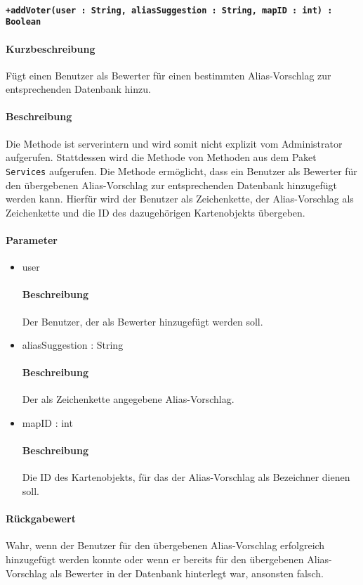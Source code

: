 \paragraph*{\texttt{+addVoter(user : String, aliasSuggestion : String, mapID : int) : Boolean}}%
\paragraph*{Kurzbeschreibung}
Fügt einen Benutzer als Bewerter für einen bestimmten Alias-Vorschlag zur entsprechenden Datenbank hinzu.
\paragraph*{Beschreibung}
Die Methode ist serverintern und wird somit nicht explizit vom Administrator aufgerufen.
Stattdessen wird die Methode von Methoden aus dem Paket \texttt{Services} aufgerufen.
Die Methode ermöglicht, dass ein Benutzer als Bewerter für den übergebenen Alias-Vorschlag zur entsprechenden Datenbank hinzugefügt werden kann.
Hierfür wird der Benutzer als Zeichenkette, der Alias-Vorschlag als Zeichenkette und die ID des dazugehörigen Kartenobjekts übergeben.
\paragraph*{Parameter}
\begin{itemize}
	\item user
		\paragraph*{Beschreibung}
		Der Benutzer, der als Bewerter hinzugefügt werden soll.
    \item aliasSuggestion : String
    		\paragraph*{Beschreibung}
    		Der als Zeichenkette angegebene Alias-Vorschlag.
    	\item mapID : int
    		\paragraph*{Beschreibung}
    		Die ID des Kartenobjekts, für das der Alias-Vorschlag als Bezeichner dienen soll.
\end{itemize}
\paragraph*{Rückgabewert}
Wahr, wenn der Benutzer für den übergebenen Alias-Vorschlag erfolgreich hinzugefügt werden konnte oder wenn er bereits für den übergebenen Alias-Vorschlag als Bewerter in der Datenbank hinterlegt war, ansonsten falsch.
